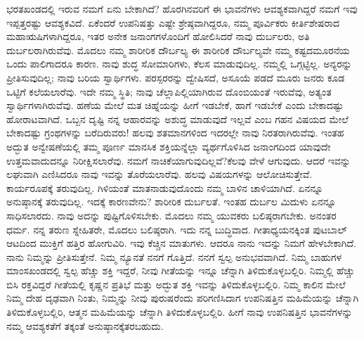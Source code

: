 ಭರತಖಂಡದಲ್ಲಿ ಇರುವ ನಮಗೆ ಏನು ಬೇಕಾಗಿದೆ? ಹೊರಗಿನವರಿಗೆ ಈ ಭಾವನೆಗಳು ಆವಶ್ಯಕವಾಗಿದ್ದರೆ ನಮಗೆ ಇವು ಇಪ್ಪತ್ತರಷ್ಟು ಆವಶ್ಯಕವಿದೆ. ಏಕೆಂದರೆ ಉಪನಿಷತ್ತು ಎಷ್ಟೇ ಶ್ರೇಷ್ಠವಾಗಿದ್ದರೂ, ನಮ್ಮ ಪೂರ್ವಿಕರು ಕೀರ್ತಿಶೇಷರಾದ ಮಹಾಋಷಿಗಳಾಗಿದ್ದರೂ, ಇತರ ಅನೇಕ ಜನಾಂಗಗಳೊಂದಿಗೆ ಹೋಲಿಸಿದರೆ ನಾವು ದುರ್ಬಲರು, ಅತಿ ದುರ್ಬಲರಾಗಿರುವೆವು. ಮೊದಲು ನಮ್ಮ ಶಾರೀರಿಕ ದೌರ್ಬಲ್ಯ ಈ ಶಾರೀರಿಕ ದೌರ್ಬಲ್ಯವೇ ನಮ್ಮ ಕಷ್ಟದ\break ಮೂರನೆಯ ಒಂದು ಪಾಲಿಗಾದರೂ ಕಾರಣ. ನಾವು ಶುದ್ಧ ಸೋಮಾರಿಗಳು, ಕೆಲಸ ಮಾಡುವುದಿಲ್ಲ. ನಮ್ಮಲ್ಲಿ ಒಗ್ಗಟ್ಟಿಲ್ಲ. ಅನ್ಯರನ್ನು ಪ್ರೀತಿಸುವುದಿಲ್ಲ; ನಾವು ಬರಿಯ ಸ್ವಾರ್ಥಿಗಳು. ಪರಸ್ಪರರನ್ನು ದ್ವೇಷಿಸದೆ, ಅಸೂಯೆ ಪಡದೆ ಮೂರು ಜನರು ಕೂಡ ಒಟ್ಟಿಗೆ ಕಲೆಯಲಾರೆವು. ಇದೇ ನಮ್ಮ ಸ್ಥಿತಿ; ನಾವು ಚೆಲ್ಲಾಪಿಲ್ಲಿಯಾಗಿರುವ ದೊಂಬಿಯಂತೆ ಇರುವೆವು, ಅತ್ಯಂತ ಸ್ವಾರ್ಥಿಗಳಾಗಿರುವೆವು. ಹಣೆಯ ಮೇಲೆ ಮತ ಚಿಹ್ನೆಯನ್ನು ಹೀಗೆ ಇಡಬೇಕೆ, ಹಾಗೆ ಇಡಬೇಕೆ ಎಂದು ಬೇಕಾದಷ್ಟು ಹೋರಾಟವಾಗಿದೆ. ಒಬ್ಬನ ದೃಷ್ಟಿ ನನ್ನ ಆಹಾರವನ್ನು ಅಶುದ್ಧ ಮಾಡುವುದೆ ಇಲ್ಲವೆ ಎಂಬ ಗಹನ ವಿಷಯದ ಮೇಲೆ ಬೇಕಾದಷ್ಟು ಗ್ರಂಥಗಳನ್ನು ಬರೆದಿರುವರು! ಹಲವು ಶತಮಾನಗಳಿಂದ ಇದರಲ್ಲೇ ನಾವು ನಿರತರಾಗಿರುವೆವು. ಇಂತಹ ಅದ್ಭುತ ಅನ್ವೇಷಣೆಯಲ್ಲಿ ತಮ್ಮ ಪೂರ್ಣ ಮಾನಸಿಕ ಶಕ್ತಿಯನ್ನೆಲ್ಲಾ ವ್ಯರ್ಥಗೊಳಿಸಿದ ಜನಾಂಗದಿಂದ ಯಾವುದೇ ಉತ್ತಮವಾದುದನ್ನೂ ನಿರೀಕ್ಷಿಸಲಾರೆವು. ನಮಗೆ ನಾಚಿಕೆಯಾಗುವುದಿಲ್ಲವೆ?ಕೆಲವು ವೇಳೆ ಆಗುವುದು. ಆದರೆ ಇವನ್ನು ಲಘುವಾಗಿ ಎಣಿಸಿದರೂ ನಾವು ಇವನ್ನು ತೊರೆಯಲಾರೆವು. ಹಲವು ವಿಷಯಗಳನ್ನು ಆಲೋಚಿಸುತ್ತೇವೆ. ಕಾರ್ಯರೂಪಕ್ಕೆ ತರುವುದಿಲ್ಲ. ಗಿಳಿಯಂತೆ ಮಾತನಾಡುವುದೊಂದು ನಮ್ಮ ಬಾಳಿನ ಚಾಳಿಯಾಗಿದೆ. ಏನನ್ನೂ ಅನುಷ್ಠಾನಕ್ಕೆ ತರುವುದಿಲ್ಲ. ಇದಕ್ಕೆ ಕಾರಣವೇನು? ಶಾರೀರಿಕ ದುರ್ಬಲತೆ. ಇಂತಹ ದುರ್ಬಲ ಮಿದುಳು ಏನನ್ನೂ ಸಾಧಿಸಲಾರದು. ನಾವು ಅದನ್ನು ಪುಷ್ಟಿಗೊಳಿಸಬೇಕು. ಮೊದಲು ನಮ್ಮ ಯುವಕರು ಬಲಿಷ್ಠರಾಗಬೇಕು. ಅನಂತರ ಧರ್ಮ. ನನ್ನ ತರುಣ ಸ್ನೇಹಿತರೇ, ಮೊದಲು ಬಲಿಷ್ಠರಾಗಿ. ಇದು ನನ್ನ ಬುದ್ಧಿವಾದ. ಗೀತಾಧ್ಯಯನಕ್ಕಿಂತ ಪುಟಬಾಲ್​ ಆಟದಿಂದ ಮುಕ್ತಿಗೆ ಹತ್ತಿರ ಹೋಗುವಿರಿ. ಇವು ಕೆಚ್ಚಿನ ಮಾತುಗಳು. ಆದರೂ ನಾನು ಇದನ್ನು ನಿಮಗೆ ಹೇಳಬೇಕಾಗಿದೆ. ನಾನು ನಿಮ್ಮನ್ನು ಪ್ರೀತಿಸುತ್ತೇನೆ. ನಿಮ್ಮ ನ್ಯೂನತೆ ನನಗೆ ಗೊತ್ತಿದೆ. ನನಗೆ ಸ್ವಲ್ಪ ಅನುಭವವಾಗಿದೆ. ನಿಮ್ಮ ಬಾಹುಗಳ ಮಾಂಸಖಂಡದಲ್ಲಿ ಸ್ವಲ್ಪ ಹೆಚ್ಚು ಶಕ್ತಿ ಇದ್ದರೆ, ನೀವು ಗೀತೆಯನ್ನು ಇನ್ನೂ ಚೆನ್ನಾಗಿ ತಿಳಿದುಕೊಳ್ಳಬಲ್ಲಿರಿ. ನಿಮ್ಮಲ್ಲಿ ಹೆಚ್ಚು ಬಿಸಿ ರಕ್ತವಿದ್ದರೆ ಗೀತೆಯಲ್ಲಿ ಕೃಷ್ಣನ ಪ್ರತಿಭೆ ಮತ್ತು ಅದ್ಭುತ ಶಕ್ತಿ ಇವನ್ನು ತಿಳಿದುಕೊಳ್ಳಬಲ್ಲಿರಿ. ನಿಮ್ಮ ಕಾಲಿನ ಮೇಲೆ ನಿಮ್ಮ ದೇಹ ದೃಢವಾಗಿ ನಿಂತು, ನಿಮ್ಮನ್ನು ನೀವು ಪುರುಷರೆಂದು ಪರಿಗಣಿಸಿದಾಗ ಉಪನಿಷತ್ತಿನ ಮಹಿಮೆಯನ್ನು ಚೆನ್ನಾಗಿ ತಿಳಿದುಕೊಳ್ಳಬಲ್ಲಿರಿ, ಆತ್ಮನ ಮಹಿಮೆಯನ್ನು ಚೆನ್ನಾಗಿ ತಿಳಿದುಕೊಳ್ಳಬಲ್ಲಿರಿ. ಹೀಗೆ ನಾವು ಉಪನಿಷತ್ತಿನ ಭಾವನೆಗಳನ್ನು ನಮ್ಮ ಆವಶ್ಯಕತೆಗೆ ತಕ್ಕಂತೆ ಅನುಷ್ಠಾನಕ್ಕೆ\break ತರಬಹುದು.

